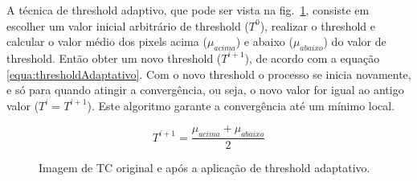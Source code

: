 A técnica de threshold adaptivo, que pode ser vista na fig.~\ref{fig:threshold}, consiste em escolher um valor inicial arbitrário de threshold ($T^0$), realizar o threshold e calcular o valor médio dos pixels acima ($\mu_{acima}$) e abaixo ($\mu_{abaixo}$) do valor de threshold. Então obter um novo threshold ($T^{i+1}$), de acordo com a equação~ \ref{equa:thresholdAdaptativo}. Com o novo threshold o processo se inicia novamente, e só para quando atingir a convergência, ou seja, o novo valor for igual ao antigo valor ($T^i = T^{i+1}$). Este algoritmo garante a convergência até um mínimo local.

\begin{equation}
 T^{i+1} = \frac{\mu_{acima}+\mu_{abaixo}}{2}
 \label{equa:thresholdAdaptativo}
\end{equation}

\begin{figure}[ht]
 \begin{center}
 \end{center}
 \caption{Imagem de TC original e após a aplicação de threshold adaptativo.}
 \label{fig:threshold}
\end{figure}

